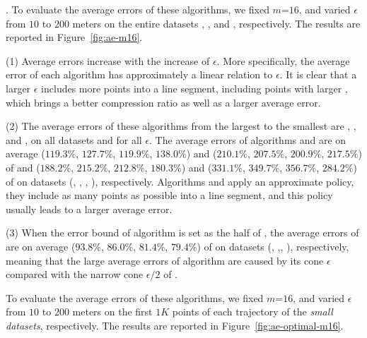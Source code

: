 {%
.
To evaluate the average errors of these algorithms, we fixed {$m$=$16$}, and
varied $\epsilon$ from $10$ to $200$ meters on the entire
{datasets} \sercar, \geolife, \mopsi and \pricar, respectively.
The results are reported in Figure~\ref{fig:ae-m16}.

\ni(1) Average errors increase with the increase of $\epsilon$.
{More specifically, the average error of each algorithm has approximately a linear relation to $\epsilon$.}
{It is clear that a larger $\epsilon$ includes more points into a line segment, including points with larger \sed, which brings a better compression ratio as well as a larger average error.}

\ni(2) The average errors of these algorithms from the largest to the smallest are \cista, \cist, \dps and \squishe, on all datasets and for all $\epsilon$.
The average errors of algorithms \cist and \cista are on average
($119.3\%$, $127.7\%$, $119.9\%$, $138.0\%$)
and ($210.1\%$, $207.5\%$, $200.9\%$, $217.5\%$)
of \dps and ($188.2\%$, $215.2\%$, $212.8\%$, $180.3\%$) and
($331.1\%$, $349.7\%$, $356.7\%$, $284.2\%$)
 of \squishe on datasets (\sercar, \geolife, \mopsi, \pricar), respectively.
{Algorithms \cista and \cist apply an approximate policy, \ie they include as many points as possible into a line segment, and this policy usually leads to a larger average error.}

\ni(3) When the error bound of algorithm \cista is set as the half of \cist, the
average errors of \cista are on average ($93.8\%$, $86.0\%$, $81.4\%$, {$79.4\%$}) of \cist on {datasets} (\sercar, \geolife,\mopsi, \pricar), respectively, meaning that the large average errors of algorithm \cista are caused by its cone \wrt $\epsilon$ compared with the narrow cone \wrt $\epsilon/2$ of \cist.

To evaluate the average errors of these algorithms, we fixed {$m$=$16$}, and
varied $\epsilon$ from $10$ to $200$ meters on the first $1K$ points of each trajectory of the \textit{small datasets}, respectively.
The results are reported in Figure~\ref{fig:ae-optimal-m16}.

}
